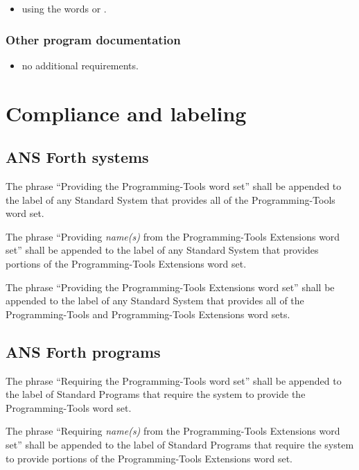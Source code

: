 \begin{itemize}
\item using the words  or
	.
\end{itemize}

\subsubsection{Other program documentation} %

\begin{itemize}
\item no additional requirements.
\end{itemize}

\section{Compliance and labeling} %

\subsection{ANS Forth systems} %

The phrase ``Providing the Programming-Tools word set'' shall be
appended to the label of any Standard System that provides all of
the Programming-Tools word set.

The phrase ``Providing \emph{name(s)} from the Programming-Tools
Extensions word set'' shall be appended to the label of any Standard
System that provides portions of the Programming-Tools Extensions
word set.

The phrase ``Providing the Programming-Tools Extensions word set''
shall be appended to the label of any Standard System that provides
all of the Programming-Tools and Programming-Tools Extensions word
sets.

\subsection{ANS Forth programs} %

The phrase ``Requiring the Programming-Tools word set'' shall be
appended to the label of Standard Programs that require the system
to provide the Programming-Tools word set.

The phrase ``Requiring \emph{name(s)} from the Programming-Tools
Extensions word set'' shall be appended to the label of Standard
Programs that require the system to provide portions of the
Programming-Tools Extensions word set.

